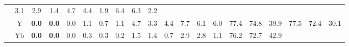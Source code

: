 \documentclass[french,10pt]{article}
\begin{document}
\begin{landscape}
\begin{longtable}{ l  c | c c c | c c c | c c c | c c c | c c c | c c c | }
    
                    &                     3.1
     & {\footnotesize     2.9
    } & {\footnotesize     1.4
     }
    
    
                    &                     4.7
     & {\footnotesize     4.4
    } & {\footnotesize     1.9
     }
    
    
                    &                     6.4
     & {\footnotesize     6.3
    } & {\footnotesize     2.2
     }
    
    
                    \\*
                        & {\small Y  }

                    &                     \textbf{ 0.0}
     & {\footnotesize     \textbf{ 0.0}
    } & {\footnotesize     0.0
     }
    
    
                    &                     1.1
     & {\footnotesize     0.7
    } & {\footnotesize     1.1
     }
    
    
                    &                     4.7
     & {\footnotesize     3.3
    } & {\footnotesize     4.4
     }
    
    
                    &                     7.7
     & {\footnotesize     6.1
    } & {\footnotesize     6.0
     }
    
    
                    &                     77.4
     & {\footnotesize     74.8
    } & {\footnotesize     39.9
     }
    
    
                    &                     77.5
     & {\footnotesize     72.4
    } & {\footnotesize     30.1
     }
    
    
                    \\*
                        & {\small Yb  }

                    &                     \textbf{ 0.0}
     & {\footnotesize     \textbf{ 0.0}
    } & {\footnotesize     0.0
     }
    
    
                    &                     0.3
     & {\footnotesize     0.3
    } & {\footnotesize     0.2
     }
    
    
                    &                     1.5
     & {\footnotesize     1.4
    } & {\footnotesize     0.7
     }
    
    
                    &                     2.9
     & {\footnotesize     2.8
    } & {\footnotesize     1.1
     }
    
    
                    &                     76.2
     & {\footnotesize     72.7
    } & {\footnotesize     42.9
     }
    

\end{longtable}
\end{landscape}
\end{document}
